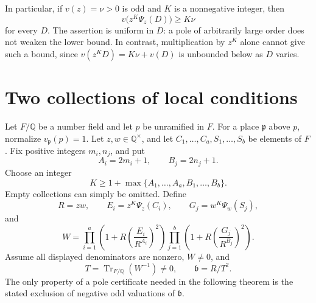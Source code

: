 \documentclass[11pt,a4paper]{article}
\newcommand{\Q}{\mathbb Q}
\DeclareMathOperator{\Tr}{Tr}
\begin{document}
In particular, if $v(z)=\nu>0$ is odd and $K$ is a nonnegative
integer, then
\begin{equation}\label{eq:inactive}
             v\bigl(z^K\Psi_z(D)\bigr)\ge K\nu
\end{equation}
for every $D$. The assertion is uniform in $D$: a pole of
arbitrarily large order does not weaken the lower bound. In contrast,
multiplication by $z^K$ alone cannot give such a bound, since
$v(z^KD)=K\nu+v(D)$ is unbounded below as $D$ varies.

\section{Two collections of local conditions}

Let $F/\Q$ be a number field and let $p$ be unramified in $F$.
For a place $\mathfrak p$ above $p$, normalize
$v_{\mathfrak p}(p)=1$. Let $z,w\in\Q^\times$, and let
$C_1,\ldots,C_a,S_1,\ldots,S_b$ be elements of $F$.
Fix positive integers $m_i,n_j$, and put
\[
        A_i=2m_i+1,\qquad B_j=2n_j+1.
\]
Choose an integer
\[
 K\ge1+\max\{A_1,\ldots,A_a,B_1,\ldots,B_b\}.
\]
Empty collections can simply be omitted. Define
\[
 R=zw,\qquad
 E_i=z^K\Psi_z(C_i),\qquad
 G_j=w^K\Psi_w(S_j),
\]
and
\begin{equation}\label{eq:product}
 W=\prod_{i=1}^a\left(1+R\left(\frac{E_i}{R^{A_i}}\right)^2\right)
   \prod_{j=1}^b\left(1+R\left(\frac{G_j}{R^{B_j}}\right)^2\right).
\end{equation}
Assume all displayed denominators are nonzero, $W\ne0$, and
\[
 T=\Tr_{F/\Q}(W^{-1})\ne0,\qquad \mathfrak b=R/T^2.
\]
The only property of a pole certificate needed in the following theorem
is the stated exclusion of negative odd valuations of $\mathfrak b$.
\end{document}
